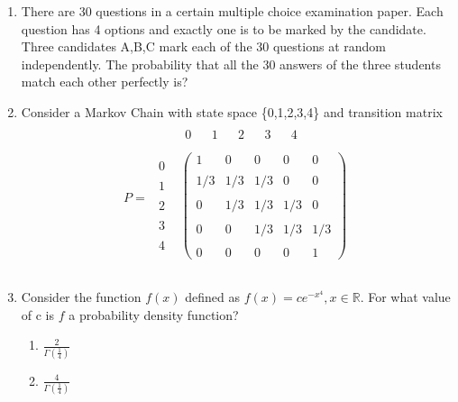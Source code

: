 \documentclass[journal,12pt,twocolumn]{IEEEtran}
\begin{document}
\begin{enumerate}[label=\arabic*.,ref=\theenumi]
\item There are 30 questions in a certain multiple choice examination paper. Each question has 4 options and exactly one is to be marked by the candidate. Three candidates A,B,C mark each of the 30 questions at random independently. The probability that all the 30 answers of the three students match each other perfectly is?

%
\item Consider a Markov Chain with state space  \{0,1,2,3,4\} and transition matrix
\begin{align}
P=\begin{matrix} & \begin{matrix}0&&1&&2&&3 && 4\end{matrix} \\\\ \begin{matrix}0\\\\1\\\\2\\\\3\\\\4\end{matrix} & \begin{pmatrix} 1 & 0 & 0 & 0 & 0 \\\\  1 / 3 & 1 / 3 & 1 / 3 & 0 & 0 \\\\  0 & 1 / 3 & 1 / 3 & 1 / 3 & 0 \\\\ 0 & 0 & 1 / 3 & 1 / 3 & 1 / 3 \\\\  0 & 0 & 0 & 0 & 1\end{pmatrix}\\\\ \end{matrix}  \nonumber
\end{align}
\item Consider the function $ f(x) $ defined as $ f(x) = c e^{-x^{4}}, x\in \mathbb{R}$. For what value of c is $f$ a probability density function?
\begin{enumerate}
\item $\frac{2}{\Gamma (\frac{1}{4})}$
\item $\frac{4}{\Gamma (\frac{1}{4})}$

\end{enumerate}
\end{enumerate}
\end{document}
